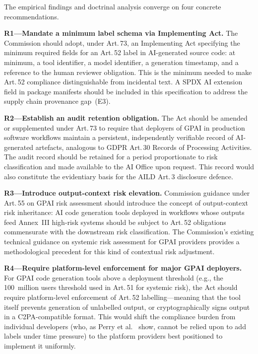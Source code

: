 \documentclass[conference]{IEEEtran}
\begin{document}
The empirical findings and doctrinal analysis converge on four concrete
recommendations.

\textbf{R1---Mandate a minimum label schema via Implementing Act.}  The
Commission should adopt, under Art.\,73, an Implementing Act specifying
the minimum required fields for an Art.\,52 label in AI-generated source
code: at minimum, a tool identifier, a model identifier, a generation
timestamp, and a reference to the human reviewer obligation.  This is
the minimum needed to make Art.\,52 compliance distinguishable from
incidental text.  A SPDX AI extension field in package manifests should
be included in this specification to address the supply chain provenance
gap~(E3).

\textbf{R2---Establish an audit retention obligation.}  The Act should
be amended or supplemented under Art.\,73 to require that deployers of
GPAI in production software workflows maintain a persistent,
independently verifiable record of AI-generated artefacts, analogous to
GDPR Art.\,30 Records of Processing Activities.  The audit record should
be retained for a period proportionate to risk classification and made
available to the AI Office upon request.  This record would also
constitute the evidentiary basis for the AILD Art.\,3 disclosure
defence.

\textbf{R3---Introduce output-context risk elevation.}  Commission
guidance under Art.\,55 on GPAI risk assessment should introduce the
concept of output-context risk inheritance: AI code generation tools
deployed in workflows whose outputs feed Annex~III high-risk systems
should be subject to Art.\,52 obligations commensurate with the
downstream risk classification.  The Commission's existing technical
guidance on systemic risk assessment for GPAI providers provides a
methodological precedent for this kind of contextual risk adjustment.

\textbf{R4---Require platform-level enforcement for major GPAI
deployers.}  For GPAI code generation tools above a deployment threshold
(e.g., the 100~million users threshold used in Art.\,51 for systemic
risk), the Act should require platform-level enforcement of Art.\,52
labelling---meaning that the tool itself prevents generation of
unlabelled output, or cryptographically signs output in a
C2PA-compatible format.  This would shift the compliance burden from
individual developers (who, as Perry et al.~\cite{perry2023} show,
cannot be relied upon to add labels under time pressure) to the platform
providers best positioned to implement it uniformly.
\end{document}
